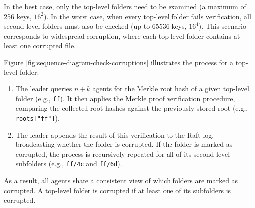 In the best case, only the top-level folders need to be examined (a maximum of 256 keys, $16^2$). In the worst case, when every top-level folder fails verification, all second-level folders must also be checked (up to 65536 keys, $16^4$). This scenario corresponds to widespread corruption, where each top-level folder contains at least one corrupted file.

Figure \ref{fig:sequence-diagram-check-corruptions} illustrates the process for a top-level folder:

\renewcommand{\labelenumi}{\textbf{(\theenumi)}}
\begin{enumerate}
    \item The leader queries $n+k$ agents for the Merkle root hash of a given top-level folder (e.g., \texttt{ff}). It then applies the Merkle proof verification procedure, comparing the collected root hashes against the previously stored root (e.g., \texttt{roots["ff"]}).
    \item The leader appends the result of this verification to the Raft log, broadcasting whether the folder is corrupted. If the folder is marked as corrupted, the process is recursively repeated for all of its second-level subfolders (e.g., \texttt{ff/4c} and \texttt{ff/6d}).
\end{enumerate}

As a result, all agents share a consistent view of which folders are marked as corrupted. A top-level folder is corrupted if at least one of its subfolders is corrupted.

